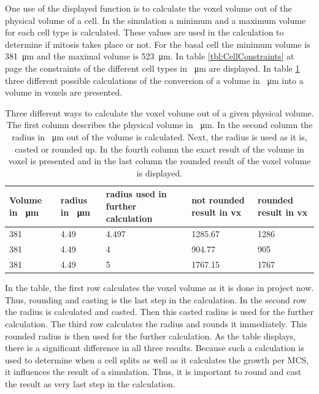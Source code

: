 One use of the displayed function is to calculate the voxel volume out of the physical volume of a cell. In the simulation a minimum and a maximum volume for each cell type is calculated. These values are used in the calculation to determine if mitosis takes place or not. \newline
For the basal cell the minimum volume is \SI{381}{\micro\metre} and the maximal volume is \SI{523}{\micro\metre}. In table \ref{tbl:CellConstraints} at page \pageref{tbl:CellConstraints} the constraints of the different cell types in \SI{}{\micro\metre} are displayed. In table \ref{tbl:Approximation error} three different possible calculations of the conversion of a volume in \SI{}{\micro\metre} into a volume in voxels are presented.

\begin{table}[h]
\centering
\caption{Three different ways to calculate the voxel volume out of a given physical volume. The first column describes the physical volume in \SI{}{\micro\metre}. In the second column the radius in \SI{}{\micro\metre} out of the volume is calculated. Next, the radius is used as it is, casted or rounded up. In the fourth column the exact result of the volume in voxel is presented and in the last column the rounded result of the voxel volume is displayed.}
\renewcommand{\arraystretch}{1.5}
	\begin{tabularx}{\textwidth}{X||X||X||X||X}
		Volume in \SI{}{\micro\metre} & radius in \SI{}{\micro\metre} & radius used in further calculation & not rounded result in vx & rounded result in vx  \\
		\hline
		381 & 4.49 & 4.497 & 1285.67 & 1286 \\
		
		381 & 4.49 & 4 & 904.77 & 905\\
		
		381 & 4.49 & 5 & 1767.15 & 1767\\

	\end{tabularx}
	\label{tbl:Approximation error}
\end{table}

In the table, the first row calculates the voxel volume as it is done in project now. Thus, rounding and casting is the last step in the calculation. In the second row the radius is calculated and casted. Then this casted radius is used for the further calculation. The third row calculates the radius and rounds it immediately. This rounded radius is then used for the further calculation. \newline
As the table displays, there is a significant difference in all three results. Because such a calculation is used to determine when a cell splits as well as it calculates the growth per \ac{MCS}, it influences the result of a simulation. Thus, it is important to round and cast the result as very last step in the calculation.




